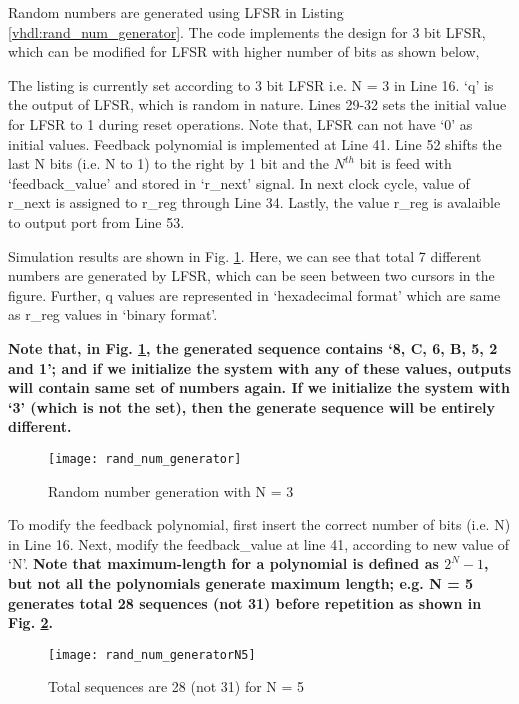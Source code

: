 Random numbers are generated using LFSR in Listing \ref{vhdl:rand_num_generator}. The code implements the design for 3 bit LFSR, which can be modified for LFSR with higher number of bits as shown below,  
\begin{explanation}
	The listing is currently set according to 3 bit LFSR i.e. N = 3 in Line 16.  `q' is the output of LFSR, which is random in nature. Lines 29-32 sets the initial value for LFSR to 1 during reset operations. Note that, LFSR can not have `0' as initial values. Feedback polynomial is implemented at Line 41. Line 52 shifts the last N bits (i.e. N to 1) to the right by 1 bit and the $N^{th}$ bit is feed with `feedback\_value' and stored in `r\_next' signal. In next clock cycle, value of r\_next is assigned to r\_reg through Line 34. Lastly, the value r\_reg is avalaible to output port from Line 53.
	
	 Simulation results are shown in Fig. \ref{fig:rand_num_generator}. Here, we can see that total 7 different numbers are generated by LFSR, which can be seen between two cursors in the figure.  Further, q values are represented in `hexadecimal format' which are same as r\_reg values in `binary format'. 
	 
	 \textbf{Note that, in Fig. \ref{fig:rand_num_generator}, the generated sequence contains `8, C, 6, B, 5, 2 and 1'; and if we initialize the system with any of these values, outputs will contain same set of numbers again. If we initialize the system with `3' (which is not the set), then the generate sequence will be entirely different.}
	
	\begin{figure}[!h]
		\centering
		\texttt{[image: rand\_num\_generator]}
		\caption{Random number generation with N = 3}
		\label{fig:rand_num_generator}
	\end{figure}
	
	To modify the feedback polynomial, first insert the correct number of bits (i.e. N) in  Line 16. Next, modify the feedback\_value at line 41, according to new value of `N'.\textbf{ Note that maximum-length for a polynomial is defined as $2^N-1$, but not all the polynomials generate maximum length; e.g. N = 5 generates total 28 sequences (not 31) before repetition as shown in Fig. \ref{fig:rand_num_generatorN5}. }
	
	\begin{figure}[!h]
		\centering
		\texttt{[image: rand\_num\_generatorN5]}
		\caption{Total sequences are 28 (not 31) for N = 5}
		\label{fig:rand_num_generatorN5}
	\end{figure}
\end{explanation}


